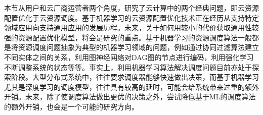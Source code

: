 本节从用户和云厂商运营者两个角度，研究了云计算中的两个经典问题，即云资源配置优化于云资源调度。基于机器学习的云资源配置优化技术正在经历从支持特定领域应用向支持通用应用的发展历程。未来，关于如何用较小的代价获取通用性较强的资源配置优化模型，将会是研究的重点。基于机器学习的资源调度算法一般都是将资源调度问题抽象为典型的机器学习领域的问题，例如通过协同过滤算法建立不同实体之间的关系，利用图神经网络对DAG图的节点进行编码，利用强化学习不断调整系统的状态等等。事实上，利用机器学习算法解决调度问题目前亦处于探索阶段。大型分布式系统中，往往要求调度器能够快速做出决策，而基于机器学习尤其是深度学习的调度模型，往往具有较高的延时，可能会给系统带来过重的额外开销。未来，除了使调度算法做出更优的决策之外，尝试降低基于ML的调度算法的额外开销，也会是一个可能的研究方向。